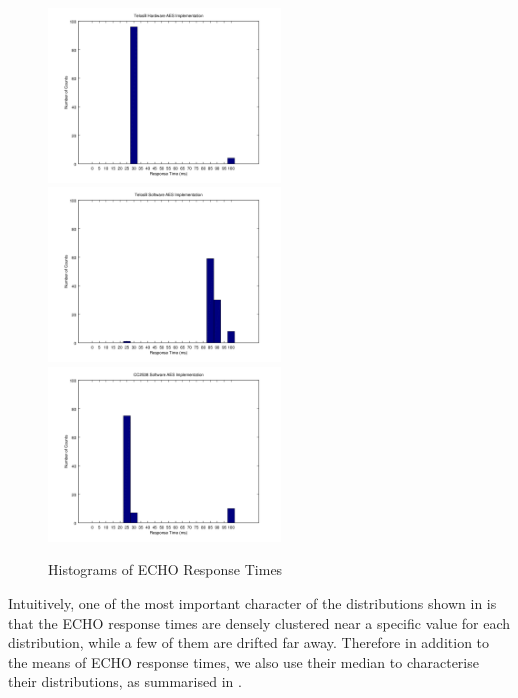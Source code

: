 \begin{figure}[ht!]
	\center
	\includegraphics[width=0.55\textwidth]{fig/noncoresec_ping_telosb_hw.png}
	\includegraphics[width=0.55\textwidth]{fig/noncoresec_ping_telosb_sw.png}
	\includegraphics[width=0.55\textwidth]{fig/noncoresec_ping_cc2538_sw.png}
	\caption{Histograms of ECHO Response Times}
	\label{Fig: Histograms of ECHO Response Times}
\end{figure}

Intuitively, one of the most important character of the distributions shown in  is that the ECHO response times are densely clustered near a specific value for each distribution, while a few of them are drifted far away. Therefore in addition to the means of ECHO response times, we also use their median to characterise their distributions, as summarised in .

